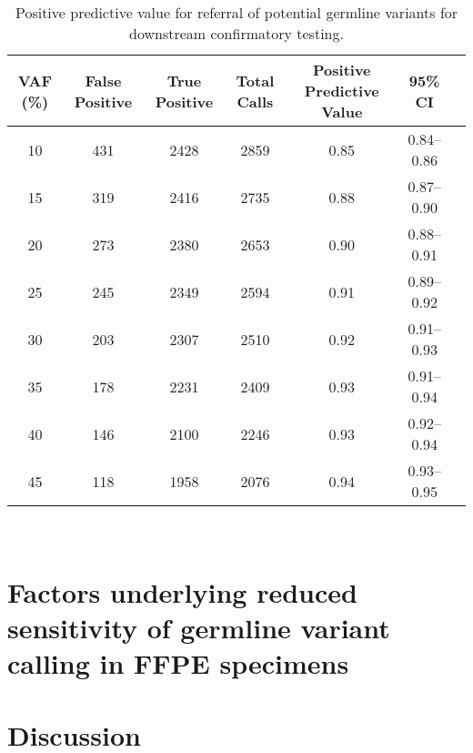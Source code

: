 \begin{table}[H]
\caption{Positive predictive value for referral of potential germline variants for downstream confirmatory testing.}
\label{ppv}
\centering
      \begin{tabular}{ccccccl}
        \hline
        VAF (\%) & False Positive & True Positive & Total Calls & Positive Predictive Value & 95\% CI
        \\
        \hline
        10 & 431 & 2428 & 2859 & 0.85 & 0.84--0.86
        \\
        15 & 319 & 2416 & 2735 & 0.88 & 0.87--0.90
        \\
        20 & 273 & 2380 & 2653 & 0.90 & 0.88--0.91
        \\
        25 & 245 & 2349 & 2594 & 0.91 & 0.89--0.92
        \\
        30 & 203 & 2307 & 2510 & 0.92 & 0.91--0.93
        \\
        35 & 178 & 2231 & 2409 & 0.93 & 0.91--0.94
        \\
        40 & 146 & 2100 & 2246 & 0.93 & 0.92--0.94
        \\
        45 & 118 & 1958 & 2076 & 0.94 & 0.93--0.95
        \\
				\hline
      \end{tabular} \\
\end{table}


\section{Factors underlying reduced sensitivity of germline variant calling in FFPE specimens}
\label{sec:FactorsunderlyingreducedsensitivityofgermlinevariantcallinginFFPEspecimens}

\section{Discussion}
\label{sec:Discussion}

